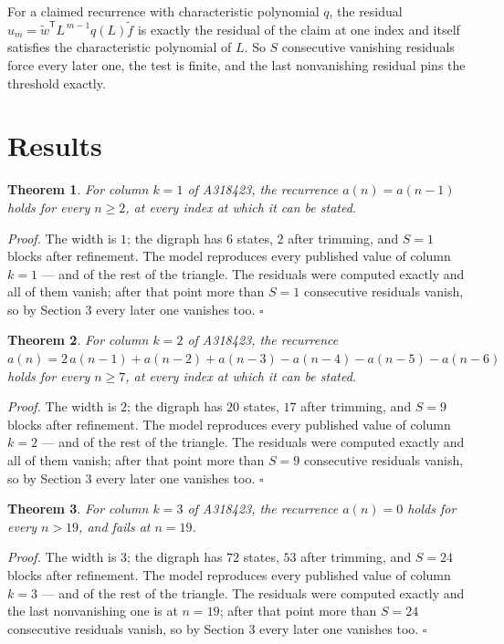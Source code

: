 \documentclass[11pt]{article}
\newtheorem{theorem}{Theorem}
\theoremstyle{definition}
\begin{document}
For a claimed recurrence with characteristic polynomial $q$, the residual $u_m = \tilde w^{\mathsf T}L^{\,m-1}q(L)\tilde f$ is exactly the residual of the claim at one index and itself satisfies the characteristic polynomial of $L$. So $S$ consecutive vanishing residuals force every later one, the test is finite, and the last nonvanishing residual pins the threshold exactly.

\section{Results}

\begin{theorem} For column $k = 1$ of A318423, the recurrence $a(n) = a(n-1)$ holds for every $n \ge 2$, at every index at which it can be stated.\end{theorem}

{\itshape Proof.} The width is $1$; the digraph has $6$ states, $2$ after trimming, and $S = 1$ blocks after refinement. The model reproduces every published value of column $k = 1$ --- and of the rest of the triangle. The residuals were computed exactly and all of them vanish; after that point more than $S = 1$ consecutive residuals vanish, so by Section 3 every later one vanishes too. $\square$

\begin{theorem} For column $k = 2$ of A318423, the recurrence $a(n) = 2\,a(n-1) + a(n-2) + a(n-3) - a(n-4) - a(n-5) - a(n-6)$ holds for every $n \ge 7$, at every index at which it can be stated.\end{theorem}

{\itshape Proof.} The width is $2$; the digraph has $20$ states, $17$ after trimming, and $S = 9$ blocks after refinement. The model reproduces every published value of column $k = 2$ --- and of the rest of the triangle. The residuals were computed exactly and all of them vanish; after that point more than $S = 9$ consecutive residuals vanish, so by Section 3 every later one vanishes too. $\square$

\begin{theorem} For column $k = 3$ of A318423, the recurrence $a(n) = 0$ holds for every $n > 19$, and fails at $n = 19$.\end{theorem}

{\itshape Proof.} The width is $3$; the digraph has $72$ states, $53$ after trimming, and $S = 24$ blocks after refinement. The model reproduces every published value of column $k = 3$ --- and of the rest of the triangle. The residuals were computed exactly and the last nonvanishing one is at $n = 19$; after that point more than $S = 24$ consecutive residuals vanish, so by Section 3 every later one vanishes too. $\square$
\end{document}
